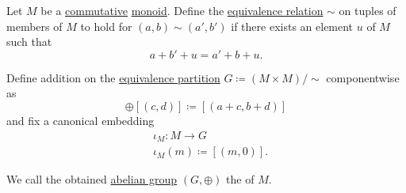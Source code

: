 \begin{definition}\label{def:monoid_grothendieck_completion}
  Let \( M \) be a \hyperref[def:magma/commutative]{commutative} \hyperref[def:monoid]{monoid}. Define the \hyperref[def:equivalence_relation]{equivalence relation} \( \sim \) on tuples of members of \( M \) to hold for \( (a, b) \sim (a', b') \) if there exists an element \( u \) of \( M \) such that
  \begin{equation*}
    a + b' + u = a' + b + u.
  \end{equation*}

  Define addition on the \hyperref[thm:equivalence_partition]{equivalence partition} \( G \coloneqq (M \times M) / {\sim }\) componentwise as
  \begin{equation*}
    [(a, b)] \oplus [(c, d)] \coloneqq [(a + c, b + d)]
  \end{equation*}
  and fix a canonical embedding
  \begin{equation*}
    \begin{aligned}
      &\iota_M: M \to G \\
      &\iota_M(m) \coloneqq [(m, 0)].
    \end{aligned}
  \end{equation*}

  We call the obtained \hyperref[def:abelian_group]{abelian group} \( (G, \oplus) \) the  of \( M \).
\end{definition}
